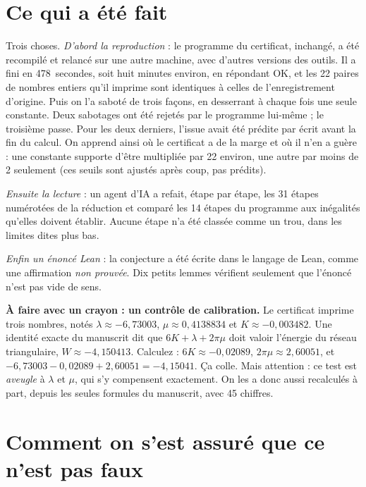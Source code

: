 \section*{Ce qui a été fait}

Trois choses. \emph{D'abord la reproduction} : le programme du certificat, inchangé, a été
recompilé et relancé sur une autre machine, avec d'autres versions des outils. Il a fini en
478~secondes, soit huit minutes environ, en répondant \og OK\fg{}, et les 22 paires de nombres
entiers qu'il imprime sont identiques à celles de l'enregistrement d'origine. Puis on l'a
saboté de trois façons, en desserrant à chaque fois une seule constante. Deux sabotages ont été
rejetés par le programme lui-même ; le troisième passe. Pour les deux derniers, l'issue avait
été prédite par écrit avant la fin du calcul. On apprend ainsi où le certificat a de la marge
et où il n'en a guère : une constante supporte d'être multipliée par 22 environ, une autre par
moins de 2 seulement (ces seuils sont ajustés après coup, pas prédits).

\emph{Ensuite la lecture} : un agent d'IA a refait, étape par étape, les 31 étapes numérotées de
la réduction et comparé les 14 étapes du programme aux inégalités qu'elles doivent établir.
Aucune étape n'a été classée comme un trou, dans les limites dites plus bas.

\emph{Enfin un énoncé Lean} : la conjecture a été écrite dans le langage de Lean, comme une
affirmation \emph{non prouvée}. Dix petits lemmes vérifient seulement que l'énoncé n'est pas
vide de sens.

\begin{encadre}
\textbf{À faire avec un crayon : un contrôle de calibration.} Le certificat imprime trois nombres, notés
$\lambda\approx-6{,}73003$, $\mu\approx0{,}4138834$ et $K\approx-0{,}003482$. Une identité exacte
du manuscrit dit que $6K+\lambda+2\pi\mu$ doit valoir l'énergie du réseau triangulaire,
$W\approx-4{,}150413$. Calculez : $6K\approx-0{,}02089$, $2\pi\mu\approx2{,}60051$, et
$-6{,}73003-0{,}02089+2{,}60051=-4{,}15041$. Ça colle. Mais attention : ce test est
\emph{aveugle} à $\lambda$ et $\mu$, qui s'y compensent exactement. On les a donc aussi
recalculés à part, depuis les seules formules du manuscrit, avec 45 chiffres.
\end{encadre}

\section*{Comment on s'est assuré que ce n'est pas faux}

